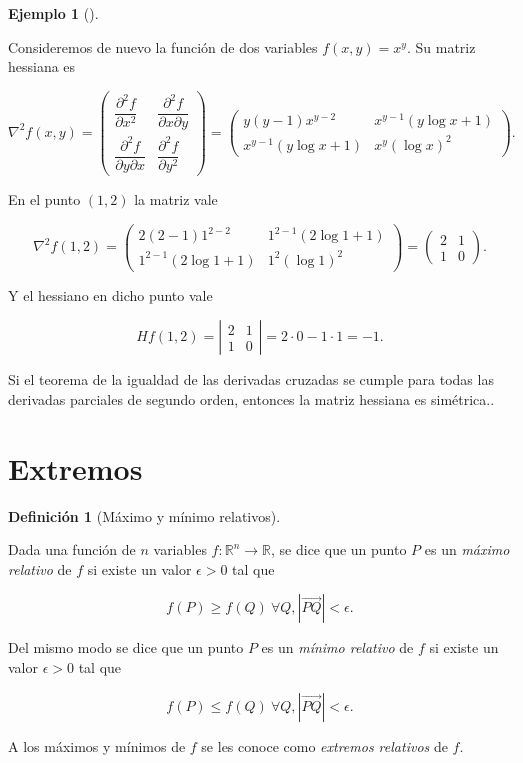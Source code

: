 \documentclass[
  a4paper,
]{scrreport}
\theoremstyle{plain}
\theoremstyle{definition}
\theoremstyle{plain}
\theoremstyle{plain}
\theoremstyle{definition}
\newtheorem{example}{Ejemplo}[chapter]
\theoremstyle{definition}
\newtheorem{definition}{Definición}[chapter]
\theoremstyle{remark}
\begin{document}
\begin{example}[]\protect\hypertarget{exm-matriz-hessiana}{}\label{exm-matriz-hessiana}

Consideremos de nuevo la función de dos variables \(f(x,y)=x^y\). Su
matriz hessiana es

\[\nabla^2f(x,y)=\left(
\begin{array}{cc}
\dfrac{\partial^2 f}{\partial x^2} & \dfrac{\partial^2 f}{\partial x \partial y}\\
\dfrac{\partial^2 f}{\partial y \partial x} & \dfrac{\partial^2 f}{\partial y^2}
\end{array}
\right)
=
\left(
\begin{array}{cc}
y(y-1)x^{y-2} & x^{y-1}(y\log x+1) \\
x^{y-1}(y\log x+1) & x^y(\log x)^2
\end{array}
\right).\]

En el punto \((1,2)\) la matriz vale

\[\nabla^2f(1,2)=\left(
\begin{array}{cc}
2(2-1)1^{2-2} & 1^{2-1}(2\log 1+1) \\
1^{2-1}(2\log 1+1) & 1^2(\log 1)^2
\end{array}
\right)
=
\left(
\begin{array}{cc}
2 & 1 \\
1 & 0
\end{array}
\right).\]

Y el hessiano en dicho punto vale

\[Hf(1,2)=\left|
\begin{array}{cc}
2 & 1 \\
1 & 0
\end{array}
\right|=
2\cdot 0-1\cdot1= -1.
\]

\end{example}

Si el teorema de la igualdad de las derivadas cruzadas se cumple para
todas las derivadas parciales de segundo orden, entonces la matriz
hessiana es simétrica..

\section{Extremos}\label{extremos}

\begin{definition}[Máximo y mínimo
relativos]\protect\hypertarget{def-extremos-relativos}{}\label{def-extremos-relativos}

Dada una función de \(n\) variables \(f:\mathbb{R}^n\to \mathbb{R}\), se
dice que un punto \(P\) es un \emph{máximo relativo} de \(f\) si existe
un valor \(\epsilon>0\) tal que

\[
f(P)\geq f(Q)\ \forall Q, |\vec{PQ}|<\epsilon.
\]

Del mismo modo se dice que un punto \(P\) es un \emph{mínimo relativo}
de \(f\) si existe un valor \(\epsilon>0\) tal que

\[
f(P)\leq f(Q)\ \forall Q, |\vec{PQ}|<\epsilon.
\]

A los máximos y mínimos de \(f\) se les conoce como \emph{extremos
relativos} de \(f\).

\end{definition}
\end{document}
